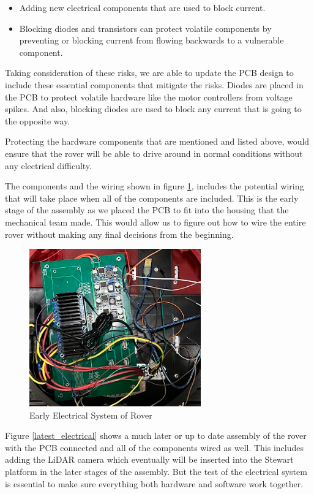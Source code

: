 \documentclass[a4paper, 10pt]{article}
\begin{document}
		\begin{itemize}
		\item Adding new electrical components that are used to block current.

		\item Blocking diodes and transistors can protect volatile components by preventing or blocking current from flowing backwards to a vulnerable component. 
	
		\end{itemize}

		Taking consideration of these risks, we are able to update the PCB design to include these essential components that mitigate the risks. Diodes are placed in the PCB to protect volatile hardware like the motor controllers from voltage spikes. And also, blocking diodes are used to block any current that is going to the opposite way. 

		Protecting the hardware components that are mentioned and listed above, would ensure that the rover will be able to drive around in normal conditions without any electrical difficulty. 

		The components and the wiring shown in figure \ref{early_electrical_rover}, includes the potential wiring that will take place when all of the components are included. This is the early stage of the assembly as we placed the PCB to fit into the housing that the mechanical team made. This would allow us to figure out how to wire the entire rover without making any final decisions from the beginning.
 
 		\begin{figure} [!h]
			\centering
			\includegraphics[scale=1.25]{Photos/Rover PCB (Wired)}
			\caption{Early Electrical System of Rover}
			\label{early_electrical_rover}
		\end{figure}

		Figure \ref{latest_electrical} shows a much later or up to date assembly of the rover with the PCB connected and all of the components wired as well. This includes adding the LiDAR camera which eventually will be inserted into the Stewart platform in the later stages of the assembly. But the test of the electrical system is essential to make sure everything both hardware and software work together.
\end{document}
